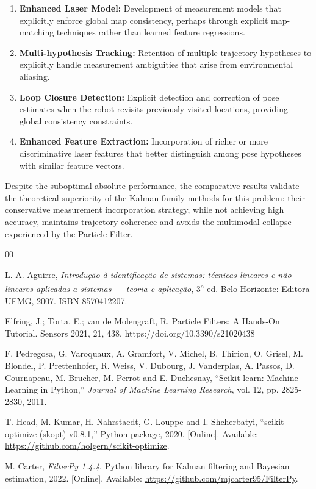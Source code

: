 \documentclass[conference]{IEEEtran}
\begin{document}
\begin{enumerate}
    \item \textbf{Enhanced Laser Model:} Development of measurement models that explicitly enforce global map consistency, perhaps through explicit map-matching techniques rather than learned feature regressions.
    
    \item \textbf{Multi-hypothesis Tracking:} Retention of multiple trajectory hypotheses to explicitly handle measurement ambiguities that arise from environmental aliasing.
    
    \item \textbf{Loop Closure Detection:} Explicit detection and correction of pose estimates when the robot revisits previously-visited locations, providing global consistency constraints.
    
    \item \textbf{Enhanced Feature Extraction:} Incorporation of richer or more discriminative laser features that better distinguish among pose hypotheses with similar feature vectors.
\end{enumerate}

Despite the suboptimal absolute performance, the comparative results validate the theoretical superiority of the Kalman-family methods for this problem: their conservative measurement incorporation strategy, while not achieving high accuracy, maintains trajectory coherence and avoids the multimodal collapse experienced by the Particle Filter.

\begin{thebibliography}{00}

L. A. Aguirre, \emph{Introdução à identificação de sistemas: técnicas lineares e não lineares aplicadas a sistemas — teoria e aplicação}, 3\textsuperscript{a} ed. Belo Horizonte: Editora UFMG, 2007. ISBN 8570412207.

Elfring, J.; Torta, E.; van de Molengraft, R. Particle Filters: A Hands-On Tutorial. Sensors 2021, 21, 438. https://doi.org/10.3390/s21020438 

F. Pedregosa, G. Varoquaux, A. Gramfort, V. Michel, B. Thirion, O. Grisel, M. Blondel, P. Prettenhofer, R. Weiss, V. Dubourg, J. Vanderplas, A. Passos, D. Cournapeau, M. Brucher, M. Perrot and E. Duchesnay, “Scikit-learn: Machine Learning in Python,” \emph{Journal of Machine Learning Research}, vol. 12, pp. 2825-2830, 2011.

T. Head, M. Kumar, H. Nahrstaedt, G. Louppe and I. Shcherbatyi, “scikit-optimize (skopt) v0.8.1,” Python package, 2020. [Online]. Available: \url{https://github.com/holgern/scikit-optimize}.

M. Carter, \emph{FilterPy 1.4.4}. Python library for Kalman filtering and Bayesian estimation, 2022. [Online]. Available: \url{https://github.com/mjcarter95/FilterPy}.

\end{thebibliography}
\end{document}
